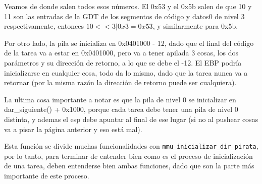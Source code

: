 Veamos de donde salen todos esos números. El 0x53 y el 0x5b salen de que 10 y 11 son las entradas de la GDT de los segmentos de código y datos0 de nivel 3 respectivamente, entonces $10 << 3 | 0x3 = 0x53$, y similarmente para 0x5b.



Por otro lado, la pila se inicializa en 0x0401000 - 12, dado que el final del código de la tarea va a estar en 0x0401000, pero va a tener apilada 3 cosas, los dos parámetros y su dirección de retorno, a lo que se debe el -12. El EBP podría inicializarse en cualquier cosa, todo da lo mismo, dado que la tarea nunca va a retornar (por la misma razón la dirección de retorno puede ser cualquiera).


La ultima cosa importante a notar es que la pila de nivel 0 se inicializar en dar_siguiente() + 0x1000, porque cada tarea debe tener una pila de nivel 0 distinta, y ademas el esp debe apuntar al final de ese lugar (si no al pushear cosas va a pisar la página anterior y eso está mal).

Esta función se divide muchas funcionalidades con \texttt{mmu_inicializar_dir_pirata}, por lo tanto, para terminar de entender bien como es el proceso de inicialización de una tarea, deben entenderse bien ambas funciones, dado que son la parte más importante de este proceso.


